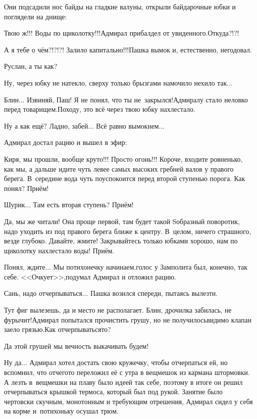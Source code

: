 Они подсадили нос байды на гладкие валуны, открыли байдарочные юбки и поглядели на днище:

\diagdash Твою ж!!! Воды по щиколотку!!!\mdash Адмирал прибалдел от увиденного.\mdash Откуда?!?!

\diagdash А я тебе о чём?!?!?! Залило капитально!!!\mdash Пашка вымок и, естественно, негодовал.
 
\diagdash Руслан, а ты как?

\diagdash Ну, через юбку не натекло, сверху только брызгами намочило нехило так$\ldots$

\diagdash Блин$\ldots$ Извиняй, Паш! Я не понял, что ты не~закрылся!\mdash Адмиралу стало неловко перед товарищем.\mdash Походу, это всё через твою юбку нахлестало.

\diagdash Ну а как ещё? Ладно, забей$\ldots$ Всё равно вымокнем$\ldots$

Адмирал достал рацию и вышел в эфир:

\diagdash Киря, мы прошли, вообще круто!!! Просто огонь!!! Короче, входите ровненько, как мы, а дальше идите чуть левее самых высоких гребней валов у правого берега. В~середине вода чуть поуспокоится перед второй ступенью порога. Как понял? Приём!

\diagdash Шурик$\ldots$ Там есть вторая ступень? Приём!

\diagdash Да, мы же читали! Она проще первой, там будет такой S\sdash образный поворотик, надо уходить из под правого берега ближе к центру. В~целом, ничего страшного, везде глубоко. Давайте, жмите! Закрывайтесь только юбками хорошо, нам по щиколотку нахлестало воды! Приём.

\diagdash Понял, ждите$\ldots$ Мы потихонечку начинаем.\mdash голос у Замполита был, конечно, так себе. <<Очкует>>,\mdash подумал Адмирал и отложил рацию.

\diagdash Сань, надо отчерпываться$\ldots$ \mdash Пашка возился спереди, пытаясь вылезти.

\diagdash Тут фиг вылезешь, да и место не располагает. Блин, дрочилка забилась, не фурычит!\mdash Адмирал попытался прочистить грушу, но не получилось\mdash видимо клапан заело грязью.\mdash Как отчерпываться\sdash то?

\diagdash Да этой грушей мы вечность выкачивать будем!

\diagdash Ну да$\ldots$ \mdash Адмирал хотел достать свою кружечку, чтобы отчерпаться ей, но вспомнил, что отчего\sdash то переложил её с утра в вещмешок из кармана штормовки. А лезть в~вещмешки на плаву было идеей так себе, поэтому в итоге он решил отчерпываться крышкой термоса, который был под рукой. Занятие было чертовски скучным, монотонным и требующим отрешения, Адмирал сидел у себя на корме и~потихоньку осушал трюм.

